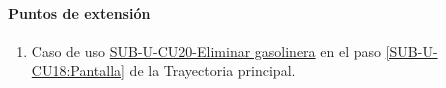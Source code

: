 \paragraph{Puntos de extensión} \label{SUB-U-CU18:P2}
\begin{enumerate}[label=PE\arabic*.]
	\item Caso de uso \hyperref[SUB-U-CU20]{SUB-U-CU20-Eliminar gasolinera} en el paso \ref{SUB-U-CU18:Pantalla} de la Trayectoria principal.
\end{enumerate}

